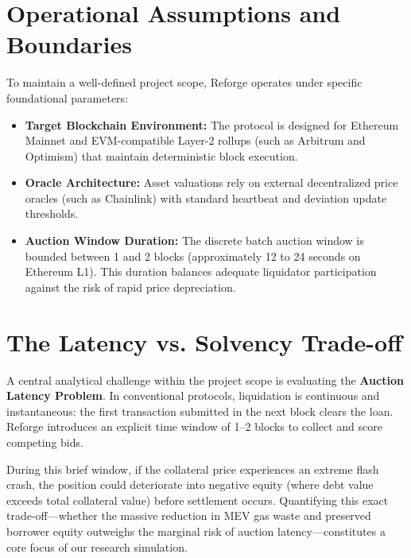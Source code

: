 \section{Operational Assumptions and Boundaries}
To maintain a well-defined project scope, Reforge operates under specific foundational parameters:
\begin{itemize}
    \item \textbf{Target Blockchain Environment:} The protocol is designed for Ethereum Mainnet and EVM-compatible Layer-2 rollups (such as Arbitrum and Optimism) that maintain deterministic block execution.
    \item \textbf{Oracle Architecture:} Asset valuations rely on external decentralized price oracles (such as Chainlink) with standard heartbeat and deviation update thresholds.
    \item \textbf{Auction Window Duration:} The discrete batch auction window is bounded between 1 and 2 blocks (approximately 12 to 24 seconds on Ethereum L1). This duration balances adequate liquidator participation against the risk of rapid price depreciation.
\end{itemize}

\section{The Latency vs. Solvency Trade-off}
A central analytical challenge within the project scope is evaluating the \textbf{Auction Latency Problem}. In conventional protocols, liquidation is continuous and instantaneous: the first transaction submitted in the next block clears the loan. Reforge introduces an explicit time window of 1--2 blocks to collect and score competing bids.

During this brief window, if the collateral price experiences an extreme flash crash, the position could deteriorate into negative equity (where debt value exceeds total collateral value) before settlement occurs. Quantifying this exact trade-off---whether the massive reduction in MEV gas waste and preserved borrower equity outweighs the marginal risk of auction latency---constitutes a core focus of our research simulation.

